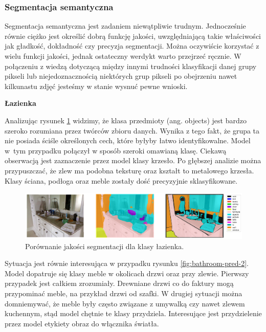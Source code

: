\subsubsection{Segmentacja semantyczna}
Segmentacja semantyczna jest zadaniem niewątpliwie trudnym. Jednocześnie równie ciężko jest określić dobrą funkcję jakości, uwzględniającą takie właściwości jak gładkość, dokładność czy precyzja segmentacji. Można oczywiście korzystać z wielu funkcji jakości, jednak ostateczny werdykt warto przejrzeć ręcznie. W połączeniu z wiedzą dotyczącą między innymi trudności klasyfikacji danej grupy pikseli lub niejedoznacznością niektórych grup pikseli po obejrzeniu nawet kilkunastu zdjęć jesteśmy w stanie wysnuć pewne wnioski.

\noindent
\textbf{Łazienka}

Analizując rysunek \ref{fig:bathroom-pred-1} widzimy, że klasa przedmioty (ang. objects) jest bardzo szeroko rozumiana przez twórców zbioru danych. Wynika z tego fakt, że grupa ta nie posiada ściśle określonych cech, które byłyby łatwo identyfikowalne. Model w~tym przypadku połączył w sposób szeroki omawianą klasę. Ciekawą obserwacją jest zaznaczenie przez model klasy krzesło. Po głębszej analizie można przypuszczać, że zlew ma podobna teksturę oraz kształt to metalowego krzesła. Klasy ściana, podłoga oraz meble zostały dość precyzyjnie sklasyfikowane.

\begin{figure}[ht!]
    \centering
    \includegraphics[width=\textwidth]{img/preds_analysis/gt_vs_pred/bathroom-1.png}
    \caption{Porównanie jakości segmentacji dla klasy łazienka.}
    \label{fig:bathroom-pred-1}
\end{figure}

Sytuacja jest równie interesująca w przypadku rysunku \ref{fig:bathroom-pred-2}. Model dopatruje się klasy meble w okolicach drzwi oraz przy zlewie. Pierwszy przypadek jest całkiem zrozumiały. Drewniane drzwi co do faktury mogą przypominać meble, na przykład drzwi od szafki. W drugiej sytuacji można domniemywać, że meble były często związane z umywalką czy nawet zlewem kuchennym, stąd model chętnie te klasy przydziela. Interesujące jest przydzielenie przez model etykiety obraz do włącznika światła.

